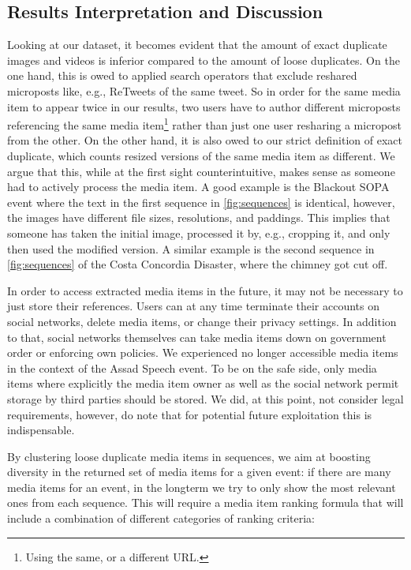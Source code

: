 \documentclass{acm_proc_article-sp}
\begin{document}
\subsection{Results Interpretation and Discussion}
Looking at our dataset, it becomes evident that the amount of exact duplicate images and videos is inferior compared to the amount of loose duplicates.
On the one hand, this is owed to applied search operators that exclude reshared microposts like, e.g., ReTweets of the same tweet.
So in order for the same media item to appear twice in our results, two users have to author different microposts referencing the same media item\footnote{Using the same, or a different URL.} rather than just one user resharing a micropost from the other.
On the other hand, it is also owed to our strict definition of exact duplicate, which counts resized versions of the same media item as different.
We argue that this, while at the first sight counterintuitive,
makes sense as someone had to actively process the media item.
A good example is the Blackout SOPA event where the text in the first sequence in \autoref{fig:sequences} is identical, however,
the images have different file sizes, resolutions, and paddings.
This implies that someone has taken the initial image, processed it by, e.g.,
cropping it, and only then used the modified version.
A similar example is the second sequence in \autoref{fig:sequences} of the Costa Concordia Disaster, where the chimney got cut off.

In order to access extracted media items in the future,
it may not be necessary to just store their references.
Users can at any time terminate their accounts on social networks,
delete media items, or change their privacy settings.
In addition to that, social networks themselves can take media items down on government order or enforcing own policies.
We experienced no longer accessible media items in the context of the Assad Speech event.
To be on the safe side, only media items where explicitly the media item owner as well as the social network permit storage by third parties should be stored.
We did, at this point, not consider legal requirements, however,
do note that for potential future exploitation this is indispensable.

By clustering loose duplicate media items in sequences,
we aim at boosting diversity in the returned set of media items for a given event:
if there are many media items for an event,
in the longterm we try to only show the most relevant ones from each sequence.
This will require a media item ranking formula that will include a combination of different categories of ranking criteria:
\end{document}
